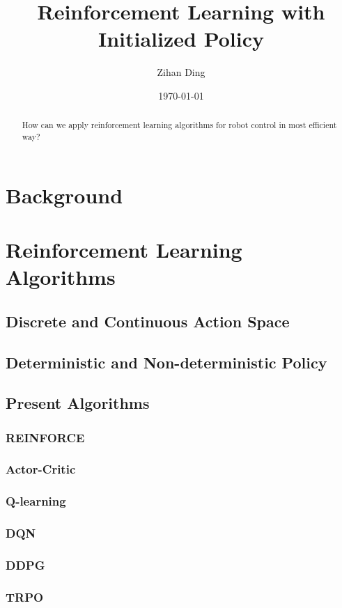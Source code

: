 \documentclass{article}
\title{Reinforcement Learning with Initialized Policy }
\author{Zihan Ding}
\date{\today}
\begin{document}
\maketitle

\tableofcontents

\begin{abstract}
How can we apply reinforcement learning algorithms for robot control in most efficient way?
\end{abstract}
\section{Background}\label{Background}


\section{Reinforcement Learning Algorithms}
\subsection{Discrete and Continuous Action Space}
\subsection{Deterministic and Non-deterministic Policy}
\subsection{Present Algorithms}
\subsubsection{REINFORCE}
\subsubsection{Actor-Critic}
\subsubsection{Q-learning}
\subsubsection{DQN}
\subsubsection{DDPG}
\subsubsection{TRPO}
\end{document}
